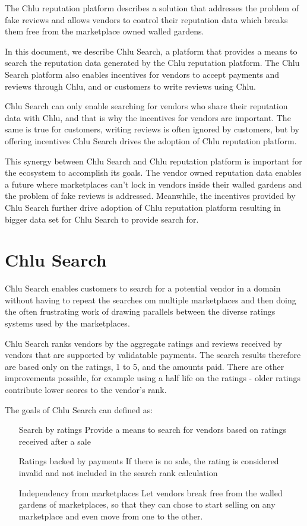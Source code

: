 \documentclass[a4paper]{article}
\begin{document}
The Chlu reputation platform\cite{chlu-reputation} describes a
solution that addresses the problem of fake reviews and allows vendors
to control their reputation data which breaks them free from the
marketplace owned walled gardens.

In this document, we describe Chlu Search, a platform that provides a
means to search the reputation data generated by the Chlu reputation
platform. The Chlu Search platform also enables incentives for vendors
to accept payments and reviews through Chlu, and or customers to write
reviews using Chlu.

Chlu Search can only enable searching for vendors who share their
reputation data with Chlu, and that is why the incentives for vendors
are important. The same is true for customers, writing reviews is
often ignored by customers, but by offering incentives Chlu Search
drives the adoption of Chlu reputation platform.

This synergy between Chlu Search and Chlu reputation platform is
important for the ecosystem to accomplish its goals. The vendor owned
reputation data enables a future where marketplaces can't lock in
vendors inside their walled gardens and the problem of fake reviews is
addressed. Meanwhile, the incentives provided by Chlu Search further
drive adoption of Chlu reputation platform resulting in bigger data
set for Chlu Search to provide search for.

\section{Chlu Search}

Chlu Search enables customers to search for a potential vendor in a
domain without having to repeat the searches om multiple marketplaces
and then doing the often frustrating work of drawing parallels between
the diverse ratings systems used by the marketplaces.

Chlu Search ranks vendors by the aggregate ratings and reviews
received by vendors that are supported by validatable payments. The
search results therefore are based only on the ratings, 1 to 5, and
the amounts paid. There are other improvements possible, for example
using a half life on the ratings - older ratings contribute lower
scores to the vendor's rank.

The goals of Chlu Search can defined as:

\begin{enumerate}
\item[Search by ratings] Provide a means to search for vendors based
  on ratings received after a sale
\item[Ratings backed by payments] If there is no sale, the rating is
  considered invalid and not included in the search rank calculation
\item[Independency from marketplaces] Let vendors break free from the
  walled gardens of marketplaces, so that they can chose to start
  selling on any marketplace and even move from one to the other.
\end{enumerate}
\end{document}
